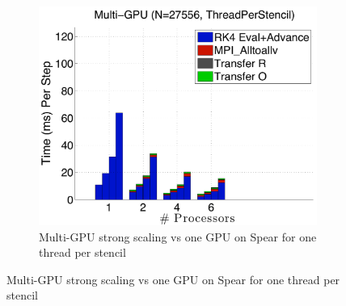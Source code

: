 \begin{figure}
\begin{subfigure}[t]{0.425\textwidth}
\label{fig:spear_alltoall_multigpu_vs_gpu_scaling}
\end{subfigure} 
\begin{subfigure}[t]{0.425\textwidth}
\centering
\includegraphics[width=1.0\textwidth]{../figures/spear_results/alltoallv_vortex/multiGPU_thread_costs.pdf}
\caption{Multi-GPU strong scaling vs one GPU on Spear for one thread per stencil}
\label{fig:alltoall_multigpu_vs_gpu_scaling}
\end{subfigure} 
\end{figure} 



